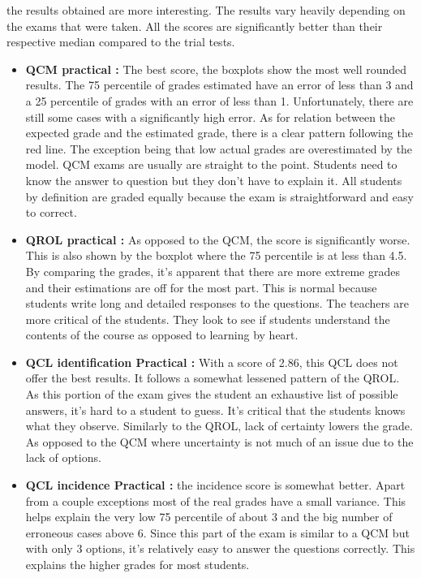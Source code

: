 \documentclass[a4paper,11pt]{report}
\numberwithin{figure}{section} %
\begin{document}
	the results obtained are more interesting.
	The results vary heavily depending on the exams that were taken.
	All the scores are significantly better than their respective median compared to the trial tests.
    \begin{itemize}
    \item[\textbullet]  \textbf{QCM practical :} The best score, the boxplots show the most well rounded results.
    The 75 percentile of grades estimated have an error of less than 3 and a 25 percentile of grades with an error of less than 1.
    Unfortunately, there are still some cases with a significantly high error.
    As for relation between the expected grade and the estimated grade, there is a clear pattern following the red line.
    The exception being that low actual grades are overestimated by the model.
    QCM exams are usually are straight to the point.
    Students need to know the answer to question but they don't have to explain it.
    All students by definition are graded equally because the exam is straightforward and easy to correct.
    \item[\textbullet]  \textbf{QROL practical :} As opposed to the QCM, the score is significantly worse.
    This is also shown by the boxplot where the 75 percentile is at less than 4.5. By comparing the grades, it's apparent that there are more extreme grades and their estimations are off for the most part.
    This is normal because students write long and detailed responses to the questions.
    The teachers are more critical of the students.
    They look to see if students understand the contents of the course as opposed to learning by heart.
    \item[\textbullet]  \textbf{QCL identification Practical :} With a score of 2.86, this QCL does not offer the best results.
    It follows a somewhat lessened pattern of the QROL. As this portion of the exam gives the student an exhaustive list of possible answers, it's hard to a student to guess.
    It's critical that the students knows what they observe.
    Similarly to the QROL, lack of certainty lowers the grade.
    As opposed to the QCM where uncertainty is not much of an issue due to the lack of options.
    \item[\textbullet]  \textbf{QCL incidence Practical :} the incidence score  is somewhat better.
    Apart from a couple exceptions most of the real grades have a small variance.
    This helps explain the very low 75 percentile of about 3 and the big number of erroneous cases above 6.
    Since this part of the exam is similar to a QCM but with only 3 options, it's relatively easy to answer the questions correctly.
    This explains the higher grades for most students.
    \end{itemize}
\end{document}
